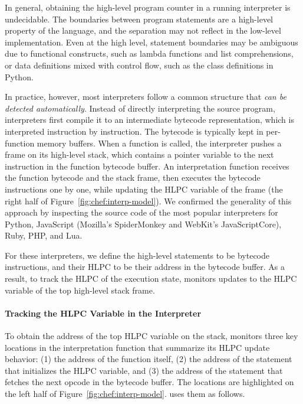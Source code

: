 In general, obtaining the high-level program counter in a running interpreter is undecidable.
%
The boundaries between program statements are a high-level property of the language, and the separation may not reflect in the low-level implementation.  Even at the high level, statement boundaries may be ambiguous due to functional constructs, such as lambda functions and list comprehensions, or data definitions mixed with control flow, such as the class definitions in Python.

In practice, however, most interpreters follow a common structure that \emph{can be detected automatically}.
%
Instead of directly interpreting the source program, interpreters first compile it to an intermediate bytecode representation, which is interpreted instruction by instruction.  The bytecode is typically kept in per-function memory buffers.
%
When a function is called, the interpreter pushes a frame on its high-level stack, which contains a pointer variable to the next instruction in the function bytecode buffer.
%
An interpretation function receives the function bytecode and the stack frame, then executes the bytecode instructions one by one, while updating the HLPC variable of the frame (the right half of Figure~\ref{fig:chef:interp-model}).
%
We confirmed the generality of this approach by inspecting the source code of the most popular interpreters for Python, JavaScript (Mozilla's SpiderMonkey and WebKit's JavaScriptCore), Ruby, PHP, and Lua.

For these interpreters, we define the \chef high-level statements to be bytecode instructions, and their HLPC to be their address in the bytecode buffer.
%
As a result, to track the HLPC of the execution state, \chef monitors updates to the HLPC variable of the top high-level stack frame.

\paragraph{Tracking the HLPC Variable in the Interpreter}

To obtain the address of the top HLPC variable on the stack, \chef monitors three key locations in the interpretation function that summarize its HLPC update behavior:
%
(1) the address of the function itself, (2) the address of the statement that initializes the HLPC variable, and (3) the address of the statement that fetches the next opcode in the bytecode buffer.  The locations are highlighted on the left half of Figure~\ref{fig:chef:interp-model}.
%
\chef uses them as follows.

